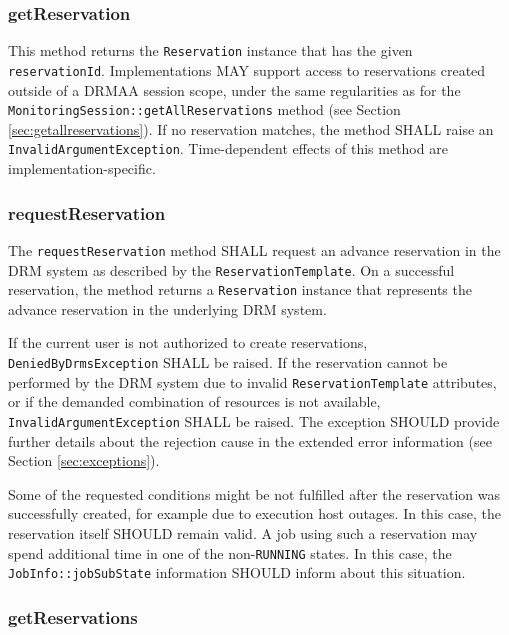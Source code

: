 \documentclass{article}
\newcommand{\h}[1]{\lstinline|#1|}
\newcommand{\rat}[1]{}
\begin{document}
\subsubsection{getReservation}

This method returns the \h{Reservation} instance that has the given \h{reservationId}. Implementations MAY support access to reservations created outside of a DRMAA session scope, under the same regularities as for the \h{MonitoringSession::getAllReservations} method (see Section \ref{sec:getallreservations}). If no reservation matches, the method SHALL raise an \h{InvalidArgumentException}.  Time-dependent effects of this method are implementation-specific. 

\subsubsection{requestReservation}

The \h{requestReservation} method SHALL request an advance reservation in the DRM system as described by the \h{ReservationTemplate}. On a successful reservation, the method returns a \h{Reservation} instance that represents the advance reservation in the underlying DRM system.

If the current user is not authorized to create reservations, \h{DeniedByDrmsException}  SHALL be raised. If the reservation cannot be performed by the DRM system due to invalid \h{ReservationTemplate} attributes, or if the demanded combination of resources is not available, \h{InvalidArgumentException} SHALL be raised. The exception SHOULD provide further details about the rejection cause in the extended error information (see Section \ref{sec:exceptions}).

Some of the requested conditions might be not fulfilled after the reservation was successfully created, for example due to execution host outages. In this case, the reservation itself SHOULD remain valid. A job using such a reservation may spend additional time in one of the non-\h{RUNNING} states. In this case, the \h{JobInfo::jobSubState} information SHOULD inform about this situation.

\rat{In DRMAA 2.0 we do not have an explicit state model for advance reservations, as the reservation state can be easily deducted by comparing current time with reservation start and end time. For this reason, we use the subState approach for informing the user about the described situation. }

\subsubsection{getReservations}
\end{document}
